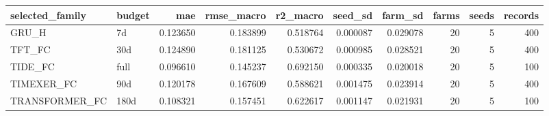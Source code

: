 \begin{tabular}{llrrrrrrrr}
\toprule
selected\_family & budget & mae & rmse\_macro & r2\_macro & seed\_sd & farm\_sd & farms & seeds & records \\
\midrule
GRU\_H & 7d & 0.123650 & 0.183899 & 0.518764 & 0.000087 & 0.029078 & 20 & 5 & 400 \\
TFT\_FC & 30d & 0.124890 & 0.181125 & 0.530672 & 0.000985 & 0.028521 & 20 & 5 & 400 \\
TIDE\_FC & full & 0.096610 & 0.145237 & 0.692150 & 0.000335 & 0.020018 & 20 & 5 & 100 \\
TIMEXER\_FC & 90d & 0.120178 & 0.167609 & 0.588621 & 0.001475 & 0.023914 & 20 & 5 & 400 \\
TRANSFORMER\_FC & 180d & 0.108321 & 0.157451 & 0.622617 & 0.001147 & 0.021931 & 20 & 5 & 100 \\
\bottomrule
\end{tabular}

